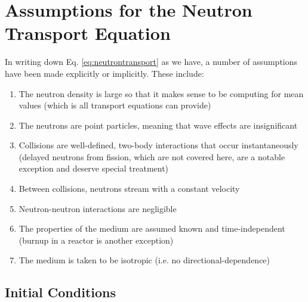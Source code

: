 \section*{Assumptions for the Neutron Transport Equation}
In writing down Eq. \ref{eq:neutrontransport} as we have, a number of assumptions have been made explicitly or implicitly.  These include:
\begin{enumerate}
   \item The neutron density is large so that it makes sense to be computing for mean values (which is all transport equations can provide)
   \item The neutrons are point particles, meaning that wave effects are insignificant
   \item Collisions are well-defined, two-body interactions that occur instantaneously (delayed neutrons from fission, which are not covered here, are a notable exception and deserve special treatment)
   \item Between collisions, neutrons stream with a constant velocity
   \item Neutron-neutron interactions are negligible
   \item The properties of the medium are assumed known and time-independent (burnup in a reactor is another exception)
   \item The medium is taken to be isotropic (i.e. no directional-dependence)
\end{enumerate}

% 
% 

\subsection*{Initial Conditions}

